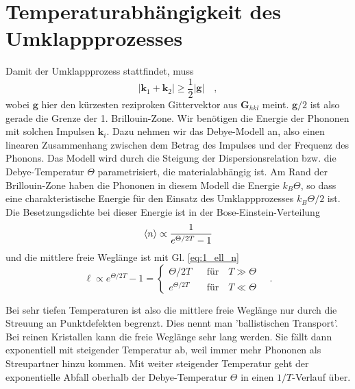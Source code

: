 \section{Temperaturabhängigkeit des Umklappprozesses}

Damit der Umklappprozess stattfindet, muss
\begin{equation}
    | \mathbf{k}_1 +  \mathbf{k}_2| \ge \frac{1}{2} | \mathbf{g} | \quad ,
\end{equation}
wobei $\mathbf{g}$ hier den kürzesten reziproken Gittervektor aus $\mathbf{G}_{hkl}$ meint. $\mathbf{g}/2$ ist also gerade die Grenze der 1. Brillouin-Zone. Wir benötigen die Energie der Phononen mit solchen Impulsen $\mathbf{k}_i$. Dazu nehmen wir das Debye-Modell an, also einen linearen Zusammenhang zwischen dem Betrag des Impulses und der Frequenz des Phonons. Das Modell wird durch die Steigung der Dispersionsrelation bzw. die Debye-Temperatur $\Theta$ parametrisiert, die materialabhängig ist.  Am Rand der Brillouin-Zone haben die Phononen in diesem Modell die Energie $k_B \Theta$, so dass eine charakteristische Energie für den Einsatz des Umklappprozesses $k_B \Theta / 2$ ist. Die Besetzungsdichte bei dieser Energie ist in der Bose-Einstein-Verteilung
\begin{equation}
    \braket{n} \propto \frac{1}{e^{\Theta / 2T} -1}
\end{equation}
und die mittlere freie Weglänge ist mit Gl.  \ref{eq:1_ell_n}
\begin{equation}
    \ell \propto e^{\Theta / 2T} -1 = 
    \left\{
    \begin{matrix*}
        \Theta / 2 T             & \text{für} \quad T \gg \Theta  \\     
        e^{\Theta / 2T} \quad & \text{für} \quad T \ll \Theta 
    \end{matrix*}
    \right. \quad .
\end{equation}


Bei sehr tiefen Temperaturen ist also die mittlere freie Weglänge nur durch die Streuung an Punktdefekten begrenzt. Dies nennt man 'ballistischen Transport'. Bei reinen Kristallen kann die freie Weglänge sehr lang werden.
Sie fällt dann exponentiell mit steigender Temperatur ab, weil immer mehr Phononen als Streupartner hinzu kommen. Mit weiter steigender Temperatur geht der exponentielle Abfall oberhalb der Debye-Temperatur $\Theta$ in einen $1/T$-Verlauf über.


